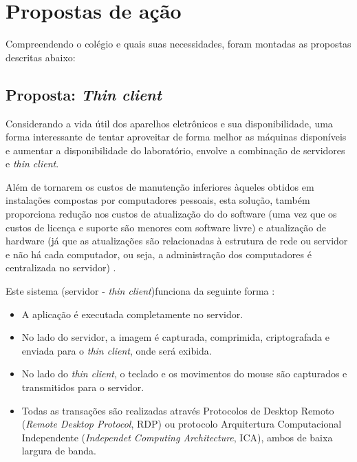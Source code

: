     \section{Propostas de ação}
    \label{sc:laboratorio_proposta}
    Compreendendo o colégio e quais suas necessidades, foram montadas
    as propostas descritas abaixo:

        \subsection{Proposta: \emph{Thin client}}
        Considerando a vida útil dos aparelhos eletrônicos e sua
        disponibilidade, uma forma interessante de tentar aproveitar de
        forma melhor as máquinas disponíveis e aumentar a disponibilidade
        do laboratório, envolve a combinação de servidores e \emph{thin
        client}.

        Além de tornarem os custos de manutenção inferiores àqueles
        obtidos em instalações compostas por computadores pessoais, esta
        solução, também proporciona redução nos custos de atualização do
        do software (uma vez que os custos de licença e suporte são
        menores com software livre) e atualização de hardware (já que as
        atualizações são relacionadas à estrutura de rede ou servidor e não
        há cada computador, ou seja, a administração dos computadores é
        centralizada no servidor) \cite{richards:2007}.

        Este sistema (servidor - \emph{thin client})funciona da seguinte
        forma \cite{techlearning:2008}:

        \begin{itemize}

            \item A aplicação é executada completamente no servidor.

            \item No lado do servidor, a imagem é capturada, comprimida,
            criptografada e enviada para o \emph{thin client}, onde será
            exibida.

            \item No lado do \emph{thin client}, o teclado e os movimentos
            do mouse são capturados e transmitidos para o servidor.

            \item Todas as transações são realizadas através Protocolos
            de Desktop Remoto (\emph{Remote Desktop Protocol}, RDP) ou
            protocolo Arquitertura Computacional Independente
            (\emph{Independet Computing Architecture}, ICA), ambos de baixa
            largura de banda.

        \end{itemize}

